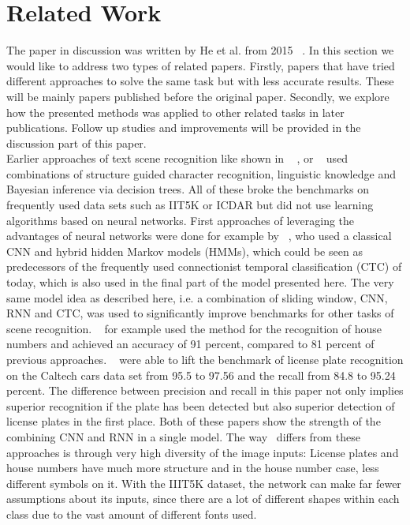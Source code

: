 \documentclass{utue} %
\begin{document}
\section{Related Work}
The paper in discussion was written by He et al. from 2015 ~\cite{2015arXiv150604395H}. In this section we would like to address two types of related papers. Firstly, papers that have tried different approaches to solve the same task but with less accurate results. These will be mainly papers published before the original paper. Secondly, we explore how the presented methods was applied to other related tasks in later publications. Follow up studies and improvements will be provided in the discussion part of this paper. \\
Earlier approaches of text scene recognition like shown in ~\cite{Mishra2012a} , or ~\cite{6727574} used combinations of structure guided character recognition, linguistic knowledge and Bayesian inference via decision trees. All of these broke the benchmarks on frequently used data sets such as IIT5K or ICDAR but did not use learning algorithms based on neural networks. First approaches of leveraging the advantages of neural networks were done for example by ~\cite{DBLP:journals/corr/AlsharifP13}, who used a classical CNN and hybrid hidden Markov models (HMMs), which could be seen as predecessors of the frequently used connectionist temporal classification (CTC) of today, which is also used in the final part of the model presented here.
The very same model idea as described here, i.e. a combination of sliding window, CNN, RNN and CTC, was used to significantly improve benchmarks for other tasks of scene recognition. ~\cite{DBLP:journals/corr/GuoTLL16} for example used the method for the recognition of house numbers and achieved an accuracy of 91 percent, compared to 81 percent of previous approaches. ~\cite{DBLP:journals/corr/LiS16} were able to lift the benchmark of license plate recognition on the Caltech cars data set from 95.5 to 97.56 and the recall from 84.8 to 95.24 percent. The difference between precision and recall in this paper not only implies superior recognition if the plate has been detected but also superior detection of license plates in the first place. Both of these papers show the strength of the combining CNN and RNN in a single model. The way~\cite{2015arXiv150604395H} differs from these approaches is through very high diversity of the image inputs: License plates and house numbers have much more structure and in the house number case, less different symbols on it. With the IIIT5K dataset, the network can make far fewer assumptions about its inputs, since there are a lot of different shapes within each class due to the vast amount of different fonts used.
\end{document}
